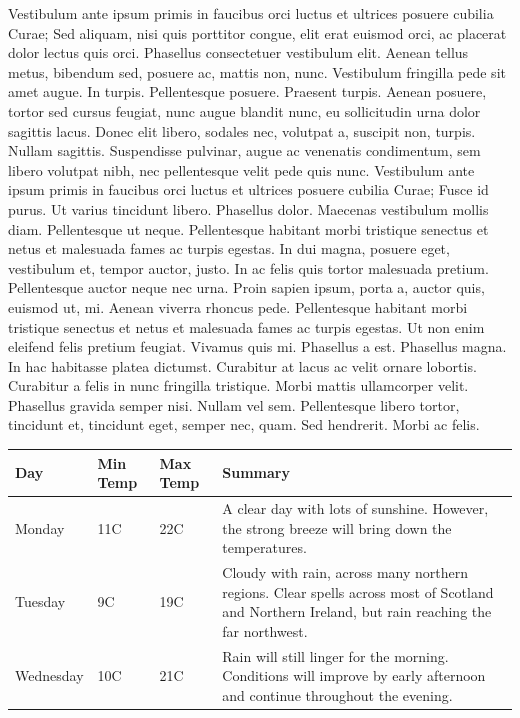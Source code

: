  Vestibulum ante ipsum primis in faucibus orci luctus et ultrices posuere cubilia Curae; Sed aliquam, nisi quis porttitor congue, elit erat euismod orci, ac placerat dolor lectus quis orci. Phasellus consectetuer vestibulum elit. Aenean tellus metus, bibendum sed, posuere ac, mattis non, nunc. Vestibulum fringilla pede sit amet augue. In turpis. Pellentesque posuere. Praesent turpis. Aenean posuere, tortor sed cursus feugiat, nunc augue blandit nunc, eu sollicitudin urna dolor sagittis lacus. Donec elit libero, sodales nec, volutpat a, suscipit non, turpis. Nullam sagittis. Suspendisse pulvinar, augue ac venenatis condimentum, sem libero volutpat nibh, nec pellentesque velit pede quis nunc. Vestibulum ante ipsum primis in faucibus orci luctus et ultrices posuere cubilia Curae; Fusce id purus. Ut varius tincidunt libero. Phasellus dolor. Maecenas vestibulum mollis diam. Pellentesque ut neque. Pellentesque habitant morbi tristique senectus et netus et malesuada fames ac turpis egestas. In dui magna, posuere eget, vestibulum et, tempor auctor, justo. In ac felis quis tortor malesuada pretium. Pellentesque auctor neque nec urna. Proin sapien ipsum, porta a, auctor quis, euismod ut, mi. Aenean viverra rhoncus pede. Pellentesque habitant morbi tristique senectus et netus et malesuada fames ac turpis egestas. Ut non enim eleifend felis pretium feugiat. Vivamus quis mi. Phasellus a est. Phasellus magna. In hac habitasse platea dictumst. Curabitur at lacus ac velit ornare lobortis. Curabitur a felis in nunc fringilla tristique. Morbi mattis ullamcorper velit. Phasellus gravida semper nisi. Nullam vel sem. Pellentesque libero tortor, tincidunt et, tincidunt eget, semper nec, quam. Sed hendrerit. Morbi ac felis.
 
  \begin{center}
     \begin{tabular}{ | l | l | l | p{7cm} |}
     \hline
     Day & Min Temp & Max Temp & Summary \\ \hline
     Monday & 11C & 22C & A clear day with lots of sunshine.  
     However, the strong breeze will bring down the temperatures. \\ \hline
     Tuesday & 9C & 19C & Cloudy with rain, across many northern regions. Clear spells
     across most of Scotland and Northern Ireland,
     but rain reaching the far northwest. \\ \hline
     Wednesday & 10C & 21C & Rain will still linger for the morning.
     Conditions will improve by early afternoon and continue
     throughout the evening. \\
     \hline
     \end{tabular}
\end{center}